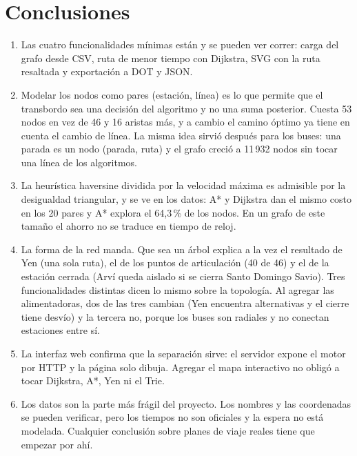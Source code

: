 \documentclass[11pt,a4paper]{article}
\begin{document}
\section{Conclusiones}

\begin{enumerate}
  \item Las cuatro funcionalidades mínimas están y se pueden ver correr: carga del
        grafo desde CSV, ruta de menor tiempo con Dijkstra, SVG con la ruta
        resaltada y exportación a DOT y JSON.
  \item Modelar los nodos como pares (estación, línea) es lo que permite que el
        transbordo sea una decisión del algoritmo y no una suma posterior. Cuesta
        53 nodos en vez de 46 y 16 aristas más, y a cambio el camino óptimo ya
        tiene en cuenta el cambio de línea. La misma idea sirvió después para los
        buses: una parada es un nodo (parada, ruta) y el grafo creció a 11\,932
        nodos sin tocar una línea de los algoritmos.
  \item La heurística haversine dividida por la velocidad máxima es admisible por
        la desigualdad triangular, y se ve en los datos: A* y Dijkstra dan el mismo
        costo en los 20 pares y A* explora el 64,3\,\% de los nodos. En un grafo
        de este tamaño el ahorro no se traduce en tiempo de reloj.
  \item La forma de la red manda. Que sea un árbol explica a la vez el resultado de
        Yen (una sola ruta), el de los puntos de articulación (40 de 46) y el de la
        estación cerrada (Arví queda aislado si se cierra Santo Domingo Savio). Tres
        funcionalidades distintas dicen lo mismo sobre la topología. Al agregar las
        alimentadoras, dos de las tres cambian (Yen encuentra alternativas y el
        cierre tiene desvío) y la tercera no, porque los buses son radiales y no
        conectan estaciones entre sí.
  \item La interfaz web confirma que la separación sirve: el servidor expone el
        motor por HTTP y la página solo dibuja. Agregar el mapa interactivo no
        obligó a tocar Dijkstra, A*, Yen ni el Trie.
  \item Los datos son la parte más frágil del proyecto. Los nombres y las
        coordenadas se pueden verificar, pero los tiempos no son oficiales y la
        espera no está modelada. Cualquier conclusión sobre planes de viaje reales
        tiene que empezar por ahí.
\end{enumerate}
\end{document}
